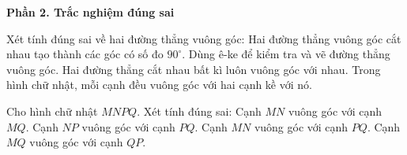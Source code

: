 \textbf{Phần 2. Trắc nghiệm đúng sai}

\begin{ex} %
Xét tính đúng sai về hai đường thẳng vuông góc:
\choiceTF
{\True Hai đường thẳng vuông góc cắt nhau tạo thành các góc có số đo $90^\circ$.}
{\True Dùng ê-ke để kiểm tra và vẽ đường thẳng vuông góc.}
{Hai đường thẳng cắt nhau bất kì luôn vuông góc với nhau.}
{\True Trong hình chữ nhật, mỗi cạnh đều vuông góc với hai cạnh kề với nó.}
\end{ex}

\begin{ex} %
Cho hình chữ nhật $MNPQ$. Xét tính đúng sai:
\choiceTF
{\True Cạnh $MN$ vuông góc với cạnh $MQ$.}
{\True Cạnh $NP$ vuông góc với cạnh $PQ$.}
{Cạnh $MN$ vuông góc với cạnh $PQ$.}
{\True Cạnh $MQ$ vuông góc với cạnh $QP$.}
\end{ex}

